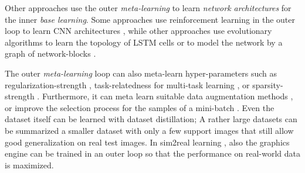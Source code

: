 Other approaches use the outer \emph{meta-learning} to learn \emph{network architectures} for the inner \emph{base learning}.
Some approaches use reinforcement learning in the outer loop to learn CNN architectures \cite{zoph2017neural}, while other approaches use evolutionary algorithms to learn the topology of LSTM cells \cite{Bayer_Wierstra_Togelius_Schmidhuber_2009} or to model the network by a graph of network-blocks \cite{10-1609-aaai-v33i01-33014780}.

The outer \emph{meta-learning} loop can also meta-learn hyper-parameters such as regularization-strength \cite{pmlr-v80-franceschi18a, Micaelli_Storkey_2021}, task-relatedness for multi-task learning \cite{10-5555-3305381-3305502}, or sparsity-strength \cite{10-5555-3305381-3305502}. Furthermore, it can meta learn suitable data augmentation methods \cite{Cubuk_2019_CVPR, Li_Hu_Wang_Hospedales_Robertson_Yang_2020}, or improve the selection process for the samples of a mini-batch \cite{10-1609-aaai-v33i01-33015741, fan2018learning}.
Even the dataset itself can be learned with dataset distillation; A rather large datasets can be summarized a smaller dataset with only a few support images \cite{Wang_Zhu_Torralba_Efros_2020, pmlr-v108-lorraine20a} that still allow good generalization on real test images. In sim2real learning \cite{Andrychowicz_Baker_Chociej_Józefowicz_McGrew_Pachocki_Petron_Plappert_Powell_Ray_2020}, also the graphics engine \cite{ruiz2018learning, Vuong_Vikram_Su_Gao_Christensen_2019} can be trained in an outer loop so that the performance on real-world data is maximized.



